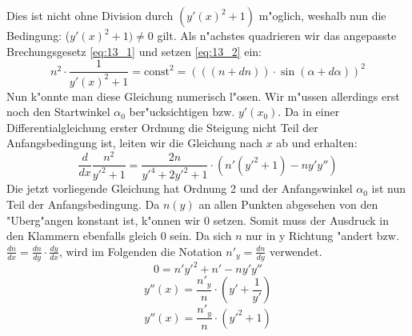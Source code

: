 \begin{refsection}
Dies ist nicht ohne Division durch $(y'(x)^2 + 1)$ m"oglich, weshalb nun die Bedingung: ($y'(x)^2 +1) \neq 0$ gilt.
Als n"achstes quadrieren wir das angepasste Brechungsgesetz \ref{eq:13_1} und setzen \ref{eq:13_2} ein:
$$n^2 \cdot \frac{1}{y'(x)^2 + 1} = \text{const}^2 = (((n + dn)) \cdot \sin(\alpha + d\alpha))^2$$
Nun k"onnte man diese Gleichung numerisch l"osen. 
Wir m"ussen allerdings erst noch den Startwinkel $\alpha_0$ ber"ucksichtigen bzw. $y'(x_0)$.
Da in einer Differentialgleichung erster Ordnung die Steigung nicht Teil der Anfangsbedingung ist, leiten wir die Gleichung nach $x$ ab und erhalten:
$$\frac{d}{dx} \frac{n^2}{y'^2 + 1}  = \frac{2n}{y'^4 + 2y'^2 + 1} \cdot \left( n'(y'^2 + 1) - n y' y'' \right)$$
Die jetzt vorliegende Gleichung hat Ordnung 2 und der Anfangswinkel $\alpha_0$ ist nun Teil der Anfangsbedingung. 
Da $n(y)$ an allen Punkten abgesehen von den "Uberg"angen konstant ist, k"onnen wir $0$ setzen.
Somit muss der Ausdruck in den Klammern ebenfalls gleich $0$ sein.
Da sich $n$ nur in y Richtung "andert bzw. $\frac{dn}{dx} = \frac{dn}{dy} \cdot \frac{dy}{dx}$, wird im Folgenden die Notation $n'_y = \frac{dn}{dy}$ verwendet.
$$0 = n' y'^2 + n' - n y' y''$$
$$y''(x) = \frac{n'_y}{n} \cdot \left( y' + \frac{1}{y'} \right)$$
\begin{equation} \label{eq:planar_DGL}
y''(x) = \frac{n'_y}{n} \cdot \left( y'^2 + 1\right)
\end{equation}


\end{refsection}
